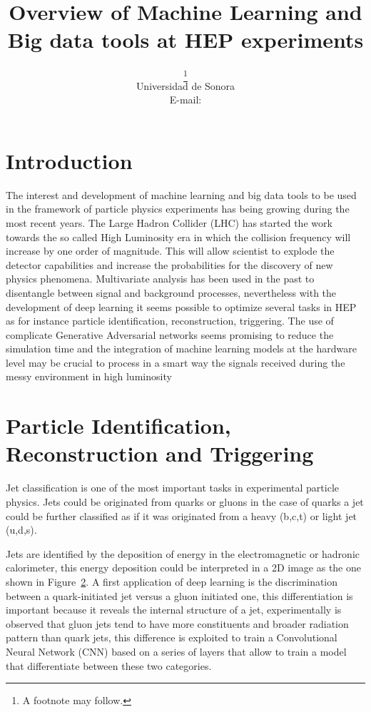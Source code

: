 \documentclass{PoS}
\title{Overview of Machine Learning and Big data tools at HEP experiments}
\author{\speaker{A. Castaneda}\thanks{A footnote may follow.}\\
        Universidad de Sonora\\
        E-mail: \email{castaned@cern.ch}}
\begin{document}
\section{Introduction}


The interest and development of machine learning and big data tools to be used in the framework of particle physics experiments
has being growing during the most recent years. The Large Hadron Collider (LHC) has started the work towards the so called
High Luminosity era in which the collision frequency will increase by one order of magnitude.  This will allow scientist to
explode the detector capabilities and increase the probabilities
for the discovery of new physics phenomena. Multivariate analysis  has been used in the past to disentangle between signal and
background processes, nevertheless with the development of deep learning it seems possible to optimize several tasks in HEP as for instance
particle identification, reconstruction, triggering.   The use of complicate Generative Adversarial networks seems promising to
reduce the simulation time and the integration of machine learning models at the hardware level may be crucial to process in a smart
way the signals received during the messy environment in high luminosity 


\section{Particle Identification, Reconstruction and Triggering}


Jet classification is one of the most important tasks in experimental particle physics. Jets could be originated from quarks or gluons
in the case of quarks a jet could be further classified as if it was originated from a heavy (b,c,t) or light jet (u,d,s). 

Jets are identified by the deposition of energy in the electromagnetic or hadronic calorimeter, this energy deposition could be interpreted in a
2D image as the one shown in Figure~\ref{}.  A first application of deep learning is the discrimination between a quark-initiated jet versus
a gluon initiated one, this differentiation is important because it reveals the internal structure of a jet, experimentally is observed that
gluon jets tend to have more constituents and broader radiation pattern than quark jets, this difference is exploited to train a Convolutional
Neural Network (CNN) based on a series of layers that allow to train a model that differentiate between these two categories.
\end{document}
